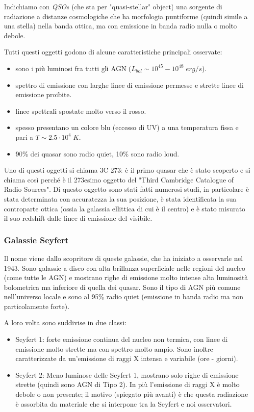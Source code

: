 Indichiamo con \emph{QSOs} (che sta per "quasi-stellar" object) una sorgente di radiazione a distanze cosmologiche che ha morfologia puntiforme (quindi simile a una stella) nella banda ottica, ma con emissione in banda radio nulla o molto debole.

Tutti questi oggetti godono di alcune caratteristiche principali osservate:
\begin{itemize}
    \item sono i più luminosi fra tutti gli AGN ($L_{bol} \sim 10^{45}-10^{48} \;\si{erg}/\si{s}$).
    \item spettro di emissione con larghe linee di emissione permesse e strette linee di emissione proibite.
    \item linee spettrali spostate molto verso il rosso.
    \item spesso presentano un colore blu (eccesso di UV) a una temperatura fissa e pari a $T\sim 2.5\cdot 10^4 \;\si{K}$.
    \item 90\% dei quasar sono radio quiet, 10\% sono radio loud.
\end{itemize}

Uno di questi oggetti si chiama 3C 273: è il primo quasar che è stato scoperto e si chiama così perché è il 273esimo oggetto del "Third Cambridge Catalogue of Radio Sources". Di questo oggetto sono stati fatti numerosi studi, in particolare è stata determinata con accuratezza la sua posizione, è stata identificata la sua controparte ottica (ossia la galassia ellittica di cui è il centro) e è stato misurato il suo redshift dalle linee di emissione del visibile. 

\subsubsection{Galassie Seyfert}
Il nome viene dallo scopritore di queste galassie, che ha iniziato a osservarle nel 1943. Sono galassie a disco con alta brillanza superficiale nelle regioni del nucleo (come tutte le AGN) e mostrano righe di emissione molto intense alta luminosità bolometrica ma inferiore di quella dei quasar.
Sono il tipo di AGN più comune nell’universo locale e sono al 95\% radio quiet (emissione in banda radio ma non particolamente forte).

A loro volta sono suddivise in due classi: 
\begin{itemize}
    \item Seyfert 1: forte emissione continua del nucleo non termica, con linee di emissione molto strette ma con spettro molto ampio. Sono inoltre caratterizzate da un'emissione di raggi X intensa e variabile (ore - giorni).
    \item Seyfert 2: Meno luminose delle Seyfert 1, mostrano solo righe di emissione strette (quindi sono AGN di Tipo 2). In più l'emissione di raggi X è molto debole o non presente; il motivo (spiegato più avanti) è che questa radiazione è assorbita da materiale che si interpone tra la Seyfert e noi osservatori. 
\end{itemize}

